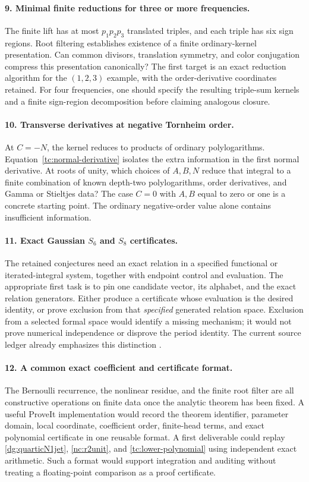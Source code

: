 \paragraph{9. Minimal finite reductions for three or more frequencies.}
The finite lift has at most $p_1p_2p_3$ translated triples, and each
triple has six sign regions. Root filtering establishes existence
of a finite ordinary-kernel presentation. Can common divisors,
translation symmetry, and color conjugation compress this
presentation canonically? The first target is an exact reduction
algorithm for the $(1,2,3)$ example, with the order-derivative
coordinates retained. For four frequencies, one should specify
the resulting triple-sum kernels and a finite sign-region
decomposition before claiming analogous closure.

\paragraph{10. Transverse derivatives at negative Tornheim order.}
At $C=-N$, the kernel reduces to products of ordinary
polylogarithms. Equation~\eqref{tc:normal-derivative} isolates the
extra information in the first normal derivative. At roots of
unity, which choices of $A,B,N$ reduce that integral to a finite
combination of known depth-two polylogarithms, order derivatives,
and Gamma or Stieltjes data? The case $C=0$ with $A,B$ equal to
zero or one is a concrete starting point. The ordinary
negative-order value alone contains insufficient information.

\paragraph{11. Exact Gaussian $S_6$ and $S_8$ certificates.}
The retained conjectures need an exact relation in a specified
functional or iterated-integral system, together with endpoint
control and evaluation. The appropriate first task is to pin one
candidate vector, its alphabet, and the exact relation generators.
Either produce a certificate whose evaluation is the desired
identity, or prove exclusion from that \emph{specified} generated
relation space. Exclusion from a selected formal space would
identify a missing mechanism; it would not prove numerical
independence or disprove the period identity. The current source
ledger already emphasizes this distinction \cite{repo}.

\paragraph{12. A common exact coefficient and certificate format.}
The Bernoulli recurrence, the nonlinear residue, and the finite root
filter are all constructive operations on finite data once the
analytic theorem has been fixed. A useful ProveIt implementation
would record the theorem identifier, parameter domain, local
coordinate, coefficient order, finite-head terms, and exact
polynomial certificate in one reusable format. A first deliverable
could replay \eqref{dg:quarticN1jet},
\eqref{nc:r2unit}, and \eqref{tc:lower-polynomial} using
independent exact arithmetic. Such a format would support
integration and auditing without treating a floating-point
comparison as a proof certificate.


